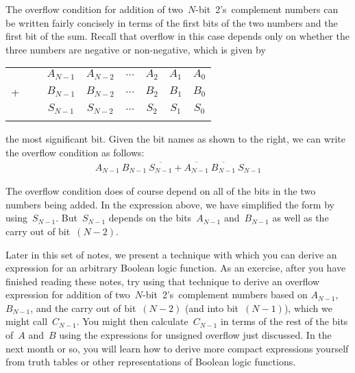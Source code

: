 \pagebreak

\begin{minipage}{4.65in}
The overflow condition for addition of two~\mbox{$N$-bit}~2's~complement
numbers can be written fairly concisely in terms of the first bits
of the two numbers and the first bit of the sum.  Recall that overflow
in this case depends only on whether the three numbers are negative
or non-negative, which is given by\linebreak
\end{minipage}\hspace{.25in}%
\begin{minipage}{1.6in}
{\arraycolsep 0pt
\tabcolsep 0pt
\begin{tabular}{rcccccc}
&$A_{N-1}$&$A_{N-2}$&$\ldots$&$A_2$&$A_1$&$A_0$\\
+~~~&$B_{N-1}$&$B_{N-2}$&$\ldots$&$B_2$&$B_1$&$B_0$\\ \hline
&$S_{N-1}$&$S_{N-2}$&$\ldots$&$S_2$&$S_1$&$S_0$\\
\\
\end{tabular}
}
\end{minipage}\mpdone

the most significant bit.  Given
the bit names as shown to the right, we can write the overflow condition
as follows:
%
\begin{eqnarray*}
A_{N-1}~B_{N-1}~\overline{S_{N-1}}+
\overline{A_{N-1}}~\overline{B_{N-1}}~S_{N-1}
\end{eqnarray*}

The overflow condition does of course depend on all of the bits in
the two numbers being added.  In the expression above, we have simplified
the form by using~$S_{N-1}$.  But~$S_{N-1}$ depends on the bits~$A_{N-1}$
and~$B_{N-1}$ as well as the carry out of bit~$(N-2)$.  

Later in this set of notes, we present a technique with which you can derive
an expression for an arbitrary Boolean logic function.  As an exercise,
after you have finished reading these notes, try using that technique to
derive an overflow expression for addition of 
two~\mbox{$N$-bit}~2's~complement numbers based on 
$A_{N-1}$, $B_{N-1}$, and the carry out of bit~$(N-2)$ (and into 
bit~$(N-1)$), which we might
call~$C_{N-1}$.  You might then calculate~$C_{N-1}$ in terms of the rest
of the bits of~$A$ and~$B$
using the expressions for
unsigned overflow just discussed.
%
In the next month or so, you will learn how to derive
more compact expressions yourself from truth tables or other representations
of Boolean logic functions.\\


